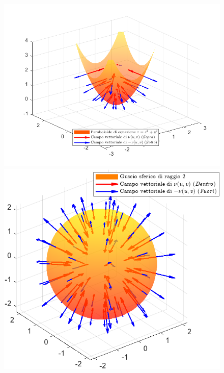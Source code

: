 \begin{example}
\begin{figure}[H]
\begin{minipage}{0.4\textwidth}
     \end{minipage}
    \begin{minipage}{0.5\textwidth}
        \includegraphics[width=\textwidth]{Capitoli/Capitolo6/Paraboloide.png}
    \end{minipage}
    \begin{minipage}{0.5\textwidth}
    \includegraphics[width=\textwidth]{Capitoli/Capitolo6/Guscio sferico.png}
    \end{minipage}
    \begin{minipage}{0.4\textwidth}

\end{minipage}
\end{figure}
\end{example}
